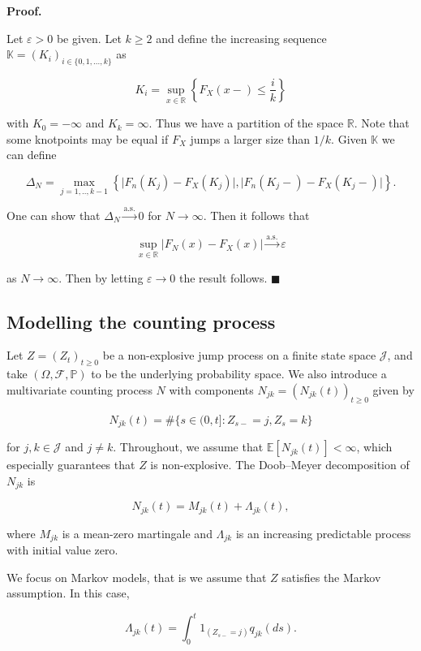\documentclass[a4paper,10pt,openany]{book}
\begin{document}
\textbf{Proof.}

Let \(\varepsilon>0\) be given. Let \(k\ge 2\) and define the increasing sequence \(\mathbb K=(K_i)_{i\in \{0,1,...,k\}}\) as

\[
K_i=\sup_{x\in\mathbb R}\left \{F_X(x-)\le \frac{i}{k}\right\}
\]

with \(K_0=-\infty\) and \(K_k=\infty\). Thus we have a partition of the space \(\mathbb R\). Note that some knotpoints may be equal if \(F_X\) jumps a larger size than \(1/k\). Given \(\mathbb K\) we can define

\[
\Delta_N=\max_{j=1,..,k-1}\left\{\vert F_n(K_j)-F_X(K_j)\vert,\vert F_n(K_j-)-F_X(K_j-)\vert\right\}.
\]

One can show that \(\Delta_N\stackrel{\text{a.s.}}{\to}0\) for \(N\to\infty\). Then it follows that

\[
\sup_{x\in\mathbb R}\left\vert F_N(x)-F_X(x)\right\vert\stackrel{\text{a.s.}}{\to}\varepsilon
\]

as \(N\to\infty\). Then by letting \(\varepsilon \to 0\) the result follows. \(\blacksquare\)

\hypertarget{modelling-the-counting-process}{%
\subsection{Modelling the counting process}\label{modelling-the-counting-process}}

Let \(Z = (Z_t)_{t\ge 0}\) be a non-explosive jump process on a finite state space \(\mathcal J\), and take \((\Omega, \mathcal F, \mathbb P)\) to be the underlying probability space. We also introduce a multivariate counting process \(N\) with components \(N_{jk} = (N_{jk}(t))_{t\ge 0}\) given by

\[
N_{jk}(t)=\#\{s\in (0,t] : Z_{s−} =j,Z_s =k\}
\]

for \(j,k\in\mathcal J\) and \(j\ne k\). Throughout, we assume that \(\mathbb E[N_{jk}(t)]<\infty\), which especially guarantees that \(Z\) is non-explosive. The Doob--Meyer decomposition of \(N_{jk}\) is

\[
N_{jk}(t)=M_{jk}(t)+\Lambda_{jk}(t),
\]

where \(M_{jk}\) is a mean-zero martingale and \(\Lambda_{jk}\) is an increasing predictable process with initial value zero.

We focus on Markov models, that is we assume that \(Z\) satisfies the Markov assumption. In this case,

\[
\Lambda_{jk}(t)=\int_0^t 1_{(Z_{s-}=j)}q_{jk}(ds).
\]
\end{document}
